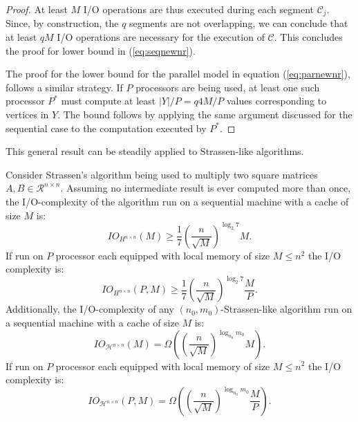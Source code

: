 \documentclass[a4paper,UKenglish]{lipics-v2016}
\newcommand{\ri}{\mathcal{R}}
\newcommand{\BOme}[1]{\Omega\left(#1\right)}
\newcommand{\io }{I/O }
\newcommand{\stral}[1]{\mathcal{H}^{#1}}
\begin{document}
\begin{proof}
	At least $M$ \io operations are thus executed during each segment $\mathcal{C}_j$. Since, by construction, the $q$ segments are not overlapping, we can conclude that at least $qM$ \io operations are necessary for the execution of $\mathcal{C}$. This concludes the proof for lower bound in (\ref{eq:seqnewnr}).
	
	The proof for the lower bound for the parallel model in equation (\ref{eq:parnewnr}), follows a similar strategy. If $P$ processors are being used, at least one such processor $P^*$ must compute at least $|Y|/P = q4M/P$ values corresponding to vertices in $Y$. The bound follows by applying the same argument discussed for the sequential case to the computation executed by $P^*$.
	\end{proof}

This general result can be steadily applied to Strassen-like algorithms.
\begin{corollary}
Consider Strassen's algorithm being used to multiply two square
matrices $A,B\in\ri^{n\times n}$.  Assuming no intermediate result is
ever computed more than once, the I/O-complexity of the algorithm run
on a sequential machine with a cache of size $M$ is:
\begin{equation}\label{eq:stranr}
	IO_{H^{n\times n}}(M) \geq \frac{1}{7}  \left( \frac{n}{\sqrt{M}}\right)^{\log_2 7} M.
\end{equation}
If run on $P$ processor each equipped with local memory of size $M\leq n^2$ the \io complexity is:
\begin{equation}\label{eq:stranrpar}
	IO_{H^{n\times n}}(P,M) \geq \frac{1}{7}  \left( \frac{n}{\sqrt{M}}\right)^{\log_2 7} \frac{M}{P}.
\end{equation}
Additionally, the I/O-complexity of any $\left(n_0,m_0\right)$-Strassen-like algorithm run on a sequential machine with a cache of size $M$ is:
\begin{equation}\label{eq:stranrlike}
	IO_{\stral{n\times n}}(M) = \BOme{  \left( \frac{n}{\sqrt{M}}\right)^{\log_{n_0} m_0} M}.
\end{equation}
If run on $P$ processor each equipped with local memory of size $M\leq n^2$ the \io complexity is:
\begin{equation}\label{eq:stranrlikepar}
	IO_{\stral{n\times n}}(P,M) =\BOme{  \left( \frac{n}{\sqrt{M}}\right)^{\log_{n_0} m_0} \frac{M}{P}}.
\end{equation}
\end{corollary}
\end{document}
